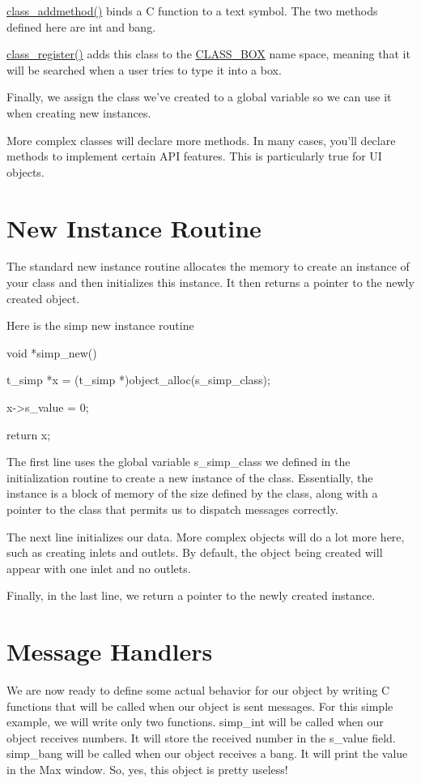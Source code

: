 \hyperlink{group__class_ga1fabf54e0cec8d4e5f732fa347b3f874}{class\_\-addmethod()} binds a C function to a text symbol. The two methods defined here are int and bang.

\hyperlink{group__class_ga0709af4aad9570f0cb91711a5c6d34d1}{class\_\-register()} adds this class to the \hyperlink{group__class_gaf640c99a1fceb8158c2d1e77381b0320}{CLASS\_\-BOX} name space, meaning that it will be searched when a user tries to type it into a box.

Finally, we assign the class we've created to a global variable so we can use it when creating new instances.

More complex classes will declare more methods. In many cases, you'll declare methods to implement certain API features. This is particularly true for UI objects.\hypertarget{chapter_anatomy_chapter_anatomy_object_new}{}\section{New Instance Routine}\label{chapter_anatomy_chapter_anatomy_object_new}
The standard new instance routine allocates the memory to create an instance of your class and then initializes this instance. It then returns a pointer to the newly created object.

Here is the simp new instance routine


\begin{DoxyCode}
    void *simp_new()
    {
        t_simp *x = (t_simp *)object_alloc(s_simp_class);

        x->s_value = 0;

        return x;
    }
\end{DoxyCode}


The first line uses the global variable s\_\-simp\_\-class we defined in the initialization routine to create a new instance of the class. Essentially, the instance is a block of memory of the size defined by the class, along with a pointer to the class that permits us to dispatch messages correctly.

The next line initializes our data. More complex objects will do a lot more here, such as creating inlets and outlets. By default, the object being created will appear with one inlet and no outlets.

Finally, in the last line, we return a pointer to the newly created instance.\hypertarget{chapter_anatomy_chapter_anatomy_object_mess_handlers}{}\section{Message Handlers}\label{chapter_anatomy_chapter_anatomy_object_mess_handlers}
We are now ready to define some actual behavior for our object by writing C functions that will be called when our object is sent messages. For this simple example, we will write only two functions. simp\_\-int will be called when our object receives numbers. It will store the received number in the s\_\-value field. simp\_\-bang will be called when our object receives a bang. It will print the value in the Max window. So, yes, this object is pretty useless!


